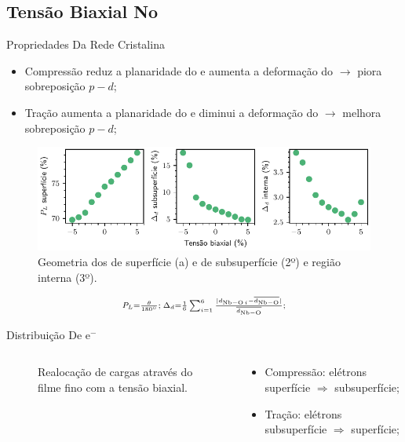 \subsection{Tensão Biaxial No \texorpdfstring{}{NaNbO3}}
\begin{frame}{Propriedades Da Rede Cristalina}
	\begin{itemize}
		\item Compressão reduz a planaridade do  e aumenta a deformação do  $\to$ piora sobreposição $p - d$;
		\item Tração aumenta a planaridade do  e diminui a deformação do  $\to$ melhora sobreposição $p - d$;
	\end{itemize}
	\begin{figure}[b]
		\centering
		\includegraphics{../floats/geometry_evo/nn_pl_baur_strain_evolution.pdf}
		\caption{Geometria dos  de superfície (a) e  de subsuperfície (2º) e região interna (3º).\label{fig:geo_evo_nn}}
	\end{figure}
	\begin{equation*}
		\scriptstyle{P_L = \frac{\theta}{\SI{180}{\degree}};\; \Delta_d = \frac{1}{6} \sum^{6}_{i=1} \frac{|d_{\ce{Nb-O}\, i} - \overline{d_{\ce{Nb-O}}}|}{\overline{d_{\ce{Nb-O}}}};}
	\end{equation*}
\end{frame}
\begin{frame}{Distribuição De e$^-$}
	\begin{columns}
		\begin{column}{.65\textwidth}
			\begin{figure}[t]
				\centering
				
				\caption{Realocação de cargas através do filme fino com a tensão biaxial.\label{fig:bader_strain_evolution}}
			\end{figure}
		\end{column}
		\begin{column}{.35\textwidth}
		\begin{itemize}
			\item Compressão: elétrons  superfície $\Rightarrow$  subsuperfície;
			\item Tração: elétrons  subsuperfície $\Rightarrow$  superfície;
		\end{itemize}	
		\end{column}
	\end{columns}
\end{frame}
